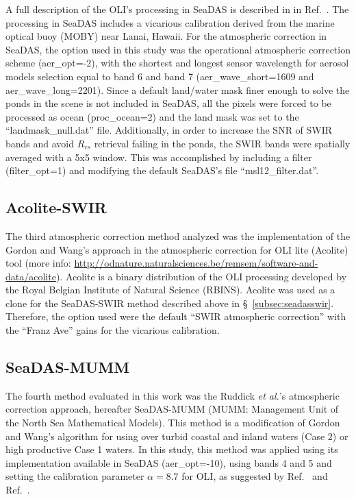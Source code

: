\documentclass[]{spie}  %
\begin{document}
A full description of the OLI's processing in SeaDAS is described in in Ref.~. The processing in SeaDAS includes a vicarious calibration derived from the marine optical buoy (MOBY) near Lanai, Hawaii. For the atmospheric correction in SeaDAS, the option used in this study was the operational atmospheric correction scheme (aer\_opt=-2), with the shortest and longest sensor wavelength for aerosol models selection equal to band 6 and band 7 (aer\_wave\_short=1609 and aer\_wave\_long=2201). Since a default land/water mask finer enough to solve the ponds in the scene is not included in SeaDAS, all the pixels were forced to be processed as ocean (proc\_ocean=2) and the land mask was set to the ``landmask\_null.dat'' file. Additionally, in order to increase the SNR of SWIR bands and avoid $R_{rs}$ retrieval failing in the ponds, the SWIR bands were spatially averaged with a 5x5 window. This was accomplished by including a filter (filter\_opt=1) and modifying the default SeaDAS's file ``msl12\_filter.dat''.
\subsection{Acolite-SWIR}
The third atmospheric correction method analyzed was the implementation of the Gordon and Wang\cite{Gordon:1994}'s approach in the atmospheric correction for OLI lite (Acolite) tool (more info: \url{http://odnature.naturalsciences.be/remsem/software-and-data/acolite}). Acolite is a binary distribution of the OLI processing developed by the Royal Belgian Institute of Natural Science (RBINS). Acolite was used as a clone for the SeaDAS-SWIR method described above in \S~\ref{subsec:seadasswir}. Therefore, the option used were the default ``SWIR atmospheric correction'' with the ``Franz Ave'' gains for the vicarious calibration.
\subsection{SeaDAS-MUMM}
The fourth method evaluated in this work was the Ruddick {\it et al.}'s atmospheric correction approach\cite{Ruddick:2000bs}, hereafter SeaDAS-MUMM (MUMM: Management Unit of the North Sea Mathematical Models). This method is a modification of Gordon and Wang's algorithm\cite{Gordon:1994} for using over turbid coastal and inland waters (Case 2) or high productive Case 1 waters. In this study, this method was applied using its implementation available in SeaDAS (aer\_opt=-10), using bands 4 and 5 and setting the calibration parameter $\alpha=8.7$ for OLI, as suggested by Ref.~ and Ref.~. 
\end{document}
